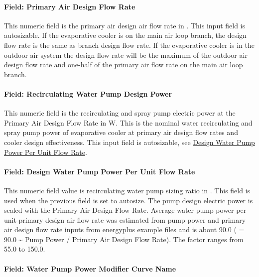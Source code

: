 \paragraph{Field: Primary Air Design Flow Rate}\label{field-primary-design-air-flow-rate}

This numeric field is the primary air design air flow rate in \si{\volumeFlowRate}. This input field is autosizable. If the evaporative cooler is on the main air loop branch, the design flow rate is the same as branch design flow rate. If the evaporative cooler is in the outdoor air system the design flow rate will be the maximum of the outdoor air design flow rate and one-half of the primary air flow rate on the main air loop branch.

\paragraph{Field: Recirculating Water Pump Design Power}

This numeric field is the recirculating and spray pump electric power at the Primary Air Design Flow Rate in \si{\watt}.
This is the nominal water recirculating and spray pump power of evaporative cooler at primary air design flow rates and cooler design effectiveness.
This input field is autosizable, see \hyperref[field-design-water-pump-power-per-unit-flow-rate]{Design Water Pump Power Per Unit Flow Rate}.

\paragraph{Field: Design Water Pump Power Per Unit Flow Rate}\label{field-design-water-pump-power-per-unit-flow-rate}

This numeric field value is recirculating water pump sizing ratio in \si{\wattperVolumeFlowRate}.
This field is used when the previous field is set to autosize. The pump design electric power is scaled with the Primary Air Design Flow Rate.
Average water pump power per unit primary design air flow rate was estimated from pump power and primary air design flow rate inputs from energyplus example files and
is about \SI{90.0}{\wattperVolumeFlowRate} ( = 90.0 \textasciitilde{} Pump Power / Primary Air Design Flow Rate). The factor ranges from 55.0 to \SI{150.0}{\wattperVolumeFlowRate}.

\paragraph{Field: Water Pump Power Modifier Curve Name}\label{field-water-pump-power-modifier-curve-name}

